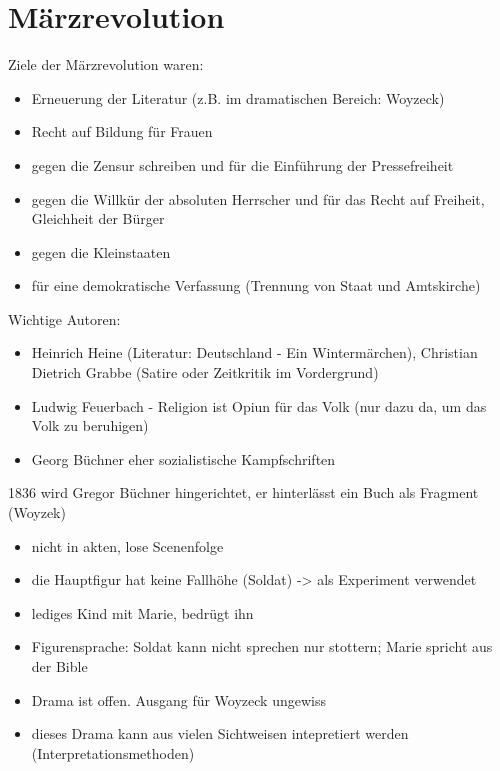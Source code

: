 \documentclass[12pt,a4paper]{article}
\begin{document}
\section{Märzrevolution}

Ziele der Märzrevolution waren:

	\begin{itemize}
	\item Erneuerung der Literatur (z.B. im dramatischen Bereich: Woyzeck)
	\item Recht auf Bildung für Frauen
	\item gegen die Zensur schreiben und für die Einführung der Pressefreiheit
	\item gegen die Willkür der absoluten Herrscher und für das Recht auf Freiheit, Gleichheit der Bürger
	\item gegen die Kleinstaaten
	\item für eine demokratische Verfassung (Trennung von Staat und Amtskirche)
	\end{itemize}

Wichtige Autoren:

	\begin{itemize}
	\item Heinrich Heine (Literatur: Deutschland - Ein Wintermärchen), Christian Dietrich Grabbe (Satire oder Zeitkritik im Vordergrund)
	\item Ludwig Feuerbach - Religion ist Opiun für das Volk (nur dazu da, um das Volk zu beruhigen)
	\item Georg Büchner eher sozialistische Kampfschriften
	\end{itemize}
	
1836 wird Gregor Büchner hingerichtet, er hinterlässt ein Buch als Fragment (Woyzek)

	\begin{itemize}
	\item nicht in akten, lose Scenenfolge
	\item die Hauptfigur hat keine Fallhöhe (Soldat) -> als Experiment verwendet
	\item lediges Kind mit Marie, bedrügt ihn
	\item Figurensprache: Soldat kann nicht sprechen nur stottern; Marie spricht aus der Bible
	\item Drama ist offen. Ausgang für Woyzeck ungewiss
	\item dieses Drama kann aus vielen Sichtweisen intepretiert werden (Interpretationsmethoden)
	\end{itemize}
\end{document}
